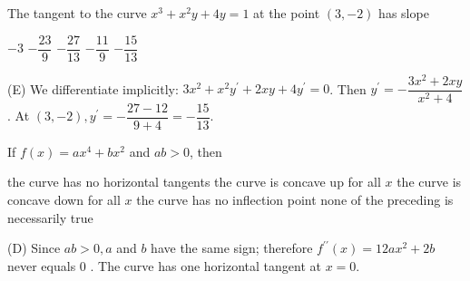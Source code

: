 \question
The tangent to the curve $x^{3}+x^{2} y+4 y=1$ at the point $(3,-2)$ has slope
\begin{choices}
  \choice $-3$
  \choice $-\dfrac{23}{9}$
  \choice $-\dfrac{27}{13}$
  \choice $-\dfrac{11}{9}$
  \CorrectChoice $-\dfrac{15}{13}$
\end{choices}
\begin{solution}
(E) We differentiate implicitly: $3 x^{2}+x^{2} y^{\prime}+2 x y+4 y^{\prime}=0$. Then $y^{\prime}=-\dfrac{3 x^{2}+2 x y}{x^{2}+4}$. At $(3,-2), y^{\prime}=-\dfrac{27-12}{9+4}=-\dfrac{15}{13}$.
\end{solution}

\question
If $f(x)=a x^{4}+b x^{2}$ and $a b>0$, then
\begin{choices}
  \choice the curve has no horizontal tangents
  \choice the curve is concave up for all $x$
  \choice the curve is concave down for all $x$
  \CorrectChoice the curve has no inflection point
  \choice none of the preceding is necessarily true
\end{choices}
\begin{solution}
(D) Since $a b>0, a$ and $b$ have the same sign; therefore $f^{\prime \prime}(x)=12 a x^{2}+2 b$ never equals 0 . The curve has one horizontal tangent at $x=0$.
\end{solution}

